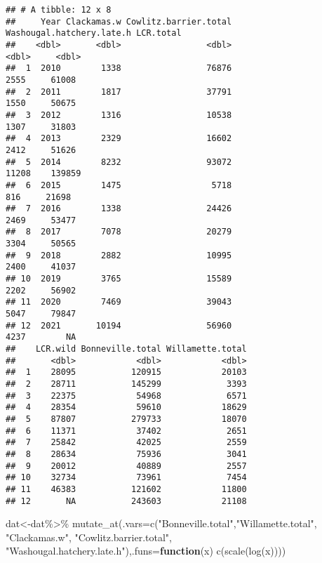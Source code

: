 \documentclass[
]{article}
\newenvironment{Shaded}{\begin{snugshade}}{\end{snugshade}}
\newcommand{\AttributeTok}[1]{\textcolor[rgb]{0.77,0.63,0.00}{#1}}
\newcommand{\ControlFlowTok}[1]{\textcolor[rgb]{0.13,0.29,0.53}{\textbf{#1}}}
\newcommand{\FunctionTok}[1]{\textcolor[rgb]{0.00,0.00,0.00}{#1}}
\newcommand{\NormalTok}[1]{#1}
\newcommand{\OtherTok}[1]{\textcolor[rgb]{0.56,0.35,0.01}{#1}}
\newcommand{\SpecialCharTok}[1]{\textcolor[rgb]{0.00,0.00,0.00}{#1}}
\newcommand{\StringTok}[1]{\textcolor[rgb]{0.31,0.60,0.02}{#1}}
\begin{document}
\begin{verbatim}
## # A tibble: 12 x 8
##     Year Clackamas.w Cowlitz.barrier.total Washougal.hatchery.late.h LCR.total
##    <dbl>       <dbl>                 <dbl>                     <dbl>     <dbl>
##  1  2010        1338                 76876                      2555     61008
##  2  2011        1817                 37791                      1550     50675
##  3  2012        1316                 10538                      1307     31803
##  4  2013        2329                 16602                      2412     51626
##  5  2014        8232                 93072                     11208    139859
##  6  2015        1475                  5718                       816     21698
##  7  2016        1338                 24426                      2469     53477
##  8  2017        7078                 20279                      3304     50565
##  9  2018        2882                 10995                      2400     41037
## 10  2019        3765                 15589                      2202     56902
## 11  2020        7469                 39043                      5047     79847
## 12  2021       10194                 56960                      4237        NA
##    LCR.wild Bonneville.total Willamette.total
##       <dbl>            <dbl>            <dbl>
##  1    28095           120915            20103
##  2    28711           145299             3393
##  3    22375            54968             6571
##  4    28354            59610            18629
##  5    87807           279733            18070
##  6    11371            37402             2651
##  7    25842            42025             2559
##  8    28634            75936             3041
##  9    20012            40889             2557
## 10    32734            73961             7454
## 11    46383           121602            11800
## 12       NA           243603            21108
\end{verbatim}

\begin{Shaded}
\begin{Highlighting}[]
\NormalTok{dat}\OtherTok{\textless{}{-}}\NormalTok{dat}\SpecialCharTok{\%\textgreater{}\%}
  \FunctionTok{mutate\_at}\NormalTok{(}\AttributeTok{.vars=}\FunctionTok{c}\NormalTok{(}\StringTok{"Bonneville.total"}\NormalTok{,}\StringTok{"Willamette.total"}\NormalTok{, }\StringTok{"Clackamas.w"}\NormalTok{, }\StringTok{"Cowlitz.barrier.total"}\NormalTok{, }\StringTok{"Washougal.hatchery.late.h"}\NormalTok{),}\AttributeTok{.funs=}\ControlFlowTok{function}\NormalTok{(x) }\FunctionTok{c}\NormalTok{(}\FunctionTok{scale}\NormalTok{(}\FunctionTok{log}\NormalTok{(x))))}
\end{Highlighting}
\end{Shaded}
\end{document}
